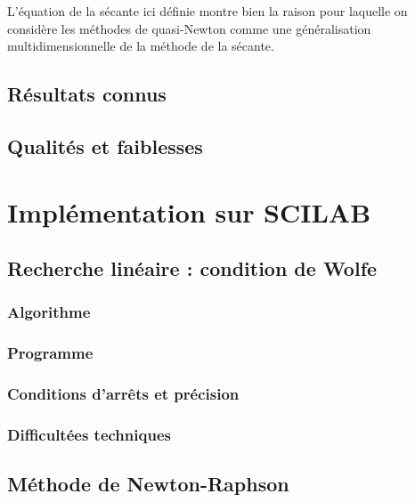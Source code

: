 \documentclass[3p, twocolumn]{elsarticle}
\begin{document}
\begin{rmk}
    L'équation de la sécante ici définie montre bien la raison pour laquelle on considère les méthodes de quasi-Newton comme une généralisation multidimensionnelle de la méthode de la sécante.
\end{rmk}

\subsection{Résultats connus}
\subsection{Qualités et faiblesses}
\section{Implémentation sur SCILAB}
\subsection{Recherche linéaire : condition de Wolfe}
\subsubsection{Algorithme}
\subsubsection{Programme}
\subsubsection{Conditions d'arrêts et précision}
\subsubsection{Difficultées techniques}
\subsection{Méthode de Newton-Raphson}
\end{document}
